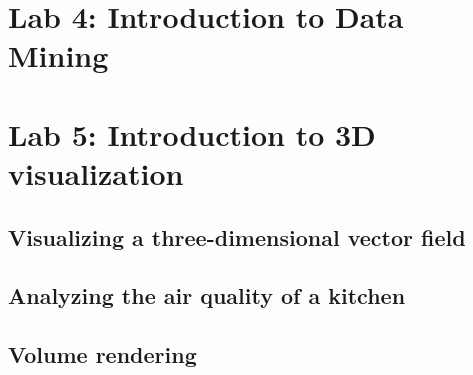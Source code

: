 \documentclass[a4paper]{article}
\begin{document}
\section{Lab 4: Introduction to Data Mining}


\section{Lab 5: Introduction to 3D visualization}

\subsection{Visualizing a three-dimensional vector field}

\subsection{Analyzing the air quality of a kitchen}

\subsection{Volume rendering}
\end{document}
